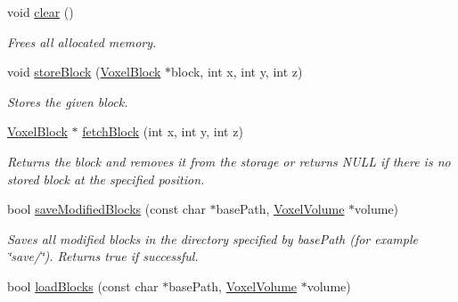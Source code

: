 \begin{DoxyCompactItemize}
\item 
\hypertarget{classGameDataStorage_a3a7a6562f8045fc0ec7adde7c7b3425d}{
void \hyperlink{classGameDataStorage_a3a7a6562f8045fc0ec7adde7c7b3425d}{clear} ()}
\label{dc/d0b/classGameDataStorage_a3a7a6562f8045fc0ec7adde7c7b3425d}

\begin{DoxyCompactList}\small\item\em \-Frees all allocated memory. \end{DoxyCompactList}\item 
\hypertarget{classGameDataStorage_aca0b1ee8b50bed0148cab6acbdea2f9c}{
void \hyperlink{classGameDataStorage_aca0b1ee8b50bed0148cab6acbdea2f9c}{store\-Block} (\hyperlink{classVoxelBlock}{\-Voxel\-Block} $\ast$block, int x, int y, int z)}
\label{dc/d0b/classGameDataStorage_aca0b1ee8b50bed0148cab6acbdea2f9c}

\begin{DoxyCompactList}\small\item\em \-Stores the given block. \end{DoxyCompactList}\item 
\hypertarget{classGameDataStorage_a282ed9bb0d606664f6e5b2fb81635c38}{
\hyperlink{classVoxelBlock}{\-Voxel\-Block} $\ast$ \hyperlink{classGameDataStorage_a282ed9bb0d606664f6e5b2fb81635c38}{fetch\-Block} (int x, int y, int z)}
\label{dc/d0b/classGameDataStorage_a282ed9bb0d606664f6e5b2fb81635c38}

\begin{DoxyCompactList}\small\item\em \-Returns the block and removes it from the storage or returns \-N\-U\-L\-L if there is no stored block at the specified position. \end{DoxyCompactList}\item 
\hypertarget{classGameDataStorage_a6cf52d4b9ab605013cc8d4d6bee825de}{
bool \hyperlink{classGameDataStorage_a6cf52d4b9ab605013cc8d4d6bee825de}{save\-Modified\-Blocks} (const char $\ast$base\-Path, \hyperlink{classVoxelVolume}{\-Voxel\-Volume} $\ast$volume)}
\label{dc/d0b/classGameDataStorage_a6cf52d4b9ab605013cc8d4d6bee825de}

\begin{DoxyCompactList}\small\item\em \-Saves all modified blocks in the directory specified by base\-Path (for example \char`\"{}save/\char`\"{}). \-Returns true if successful. \end{DoxyCompactList}\item 
\hypertarget{classGameDataStorage_a2a70a7c2efc49ac937ee68b27d9205bb}{
bool \hyperlink{classGameDataStorage_a2a70a7c2efc49ac937ee68b27d9205bb}{load\-Blocks} (const char $\ast$base\-Path, \hyperlink{classVoxelVolume}{\-Voxel\-Volume} $\ast$volume)}
\label{dc/d0b/classGameDataStorage_a2a70a7c2efc49ac937ee68b27d9205bb}


\end{DoxyCompactItemize}
